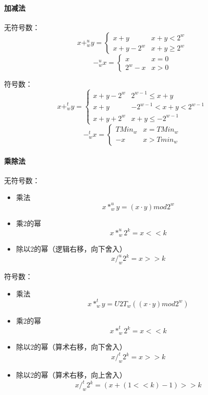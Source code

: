 \paragraph{加减法}

无符号数：
$$
    x +_w^u y =
    \begin{cases}
        x + y       & x + y < 2^w    \\
        x + y - 2^w & x + y \geq 2^w
    \end{cases}
$$
$$
    -_w^u x =
    \begin{cases}
        x       & x = 0 \\
        2^w - x & x > 0
    \end{cases}
$$

符号数：
$$
    x +_w^t y =
    \begin{cases}
        x + y - 2^w & 2^{w-1} \leq x + y         \\
        x + y       & -2^{w-1} < x + y < 2^{w-1} \\
        x + y + 2^w & x + y \leq -2^{w-1}
    \end{cases}
$$
$$
    -_w^t x =
    \begin{cases}
        TMin_w & x = TMin_w \\
        - x    & x > Tmin_w
    \end{cases}
$$
\paragraph{乘除法}

无符号数：
\begin{itemize}
    \item 乘法
          $$
              x *_w^u y = (x \cdot y) mod 2^w
          $$
    \item 乘2的幂
          $$
              x *_w^u 2^k = x << k
          $$
    \item 除以2的幂（逻辑右移，向下舍入）
          $$
              x /_w^u 2^k = x >> k
          $$
\end{itemize}




符号数：
\begin{itemize}
    \item 乘法
          $$
              x *_w^t y = U2T_w((x \cdot y) mod 2^w)
          $$
    \item 乘2的幂
          $$
              x *_w^t 2^k = x << k
          $$
    \item 除以2的幂（算术右移，向下舍入）
          $$
              x /_w^t 2^k = x >> k
          $$
    \item 除以2的幂（算术右移，向上舍入）
          $$
              x /_w^t 2^k = (x + (1 << k) - 1) >> k
          $$
\end{itemize}

